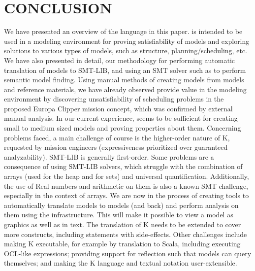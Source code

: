 \section{CONCLUSION}
\label{sec:conclusion}

We have presented an overview of the \Klang{} language in this
paper. \Klang{} is intended to be used in a modeling environment for
proving satisfiability of \sysml{} models and exploring solutions to
various types of models, such as structure,
planning/scheduling, etc. We have also presented in detail, our
methodology for performing automatic translation of \Klang{}
models to SMT-LIB, and using an SMT solver such as \zthree{}
to perform semantic model finding. Using manual methods of creating \Klang{}
models from \sysml{} models and reference materials, we have
already observed \Klang{} provide value in the modeling environment by
discovering unsatisfiability of scheduling problems in the proposed
Europa Clipper mission concept, which was confirmed by external manual
analysis.  In our current experience, \Klang{} seems to be sufficient
for creating small to medium sized \sysml{} models and proving
properties about them.
%
Concerning problems faced, a main challenge of course is the
higher-order nature of K, requested by mission engineers
(expressiveness prioritized over guaranteed analyzability).  SMT-LIB
is generally first-order.  Some problems are a consequence of using
SMT-LIB solvers, which struggle with the combination of arrays (used
for the heap and for sets) and universal quantification. Additionally,
the use of Real numbers and arithmetic on them is also a known SMT
challenge, especially in the context of arrays.
%
We are now in the process of creating tools to automatically translate
\sysml{} models to \Klang{} models (and back) and perform analysis on
them using the \Klang{} infrastructure. This will make it possible to view
a model as graphics as well as in text. The translation of K needs to
be extended to cover more constructs, including statements with
side-effects. Other challenges include making K executable, for example by translation
to Scala, including executing OCL-like expressions;
providing support for reflection such that models can query themselves;
and making the K language and textual notation user-extensible.
